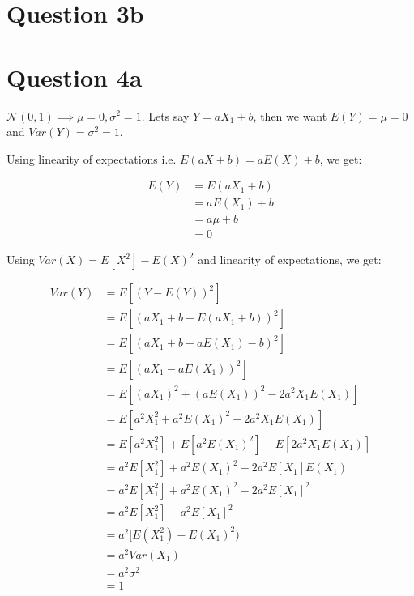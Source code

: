 \documentclass{article}
\begin{document}
    \section*{Question 3b}

    \section*{Question 4a}
    $\mathcal{N}(0,1) \implies \mu = 0, \sigma^{2} = 1$. Lets say $Y = aX_{1} + b$, then we want $E(Y) = \mu = 0$ and $Var(Y) = \sigma^{2} = 1$.

    Using linearity of expectations i.e. $E(aX + b) = aE(X) + b$, we get:

    \begin{align*}
        E(Y)    &= E(aX_{1} + b) \\
                &= aE(X_{1}) + b \\
                &= a \mu + b \\
                &= 0
    \end{align*}

    Using $Var(X) = E[X^{2}] - E(X)^{2}$ and linearity of expectations, we get:

    \begin{align*}
        Var(Y)  &= E[(Y - E(Y))^{2}] \\
                &= E[(aX_{1} + b - E(aX_{1} + b))^{2}] \\
                &= E[(aX_{1} + b - aE(X_{1}) - b)^{2}] \\
                &= E[(aX_{1} - aE(X_{1}))^{2}] \\
                &= E[(aX_{1})^{2} + (aE(X_{1}))^{2} - 2a^{2}X_{1}E(X_{1})] \\
                &= E[a^{2}X_{1}^{2} + a^{2}E(X_{1})^{2} - 2a^{2}X_{1}E(X_{1})] \\
                &= E[a^{2}X_{1}^{2}] + E[a^{2}E(X_{1})^{2}] - E[2a^{2}X_{1}E(X_{1})] \\
                &= a^{2}E[X_{1}^{2}] + a^{2}E(X_{1})^{2} - 2a^{2}E[X_{1}]E(X_{1}) \\
                &= a^{2}E[X_{1}^{2}] + a^{2}E(X_{1})^{2} - 2a^{2}E[X_{1}]^{2} \\
                &= a^{2}E[X_{1}^{2}] - a^{2}E[X_{1}]^{2} \\
                &= a^{2}[E(X_{1}^{2}) - E(X_{1})^{2}) \\
                &= a^{2}Var(X_{1}) \\
                &= a^{2} \sigma^{2} \\
                &= 1
    \end{align*}
\end{document}
